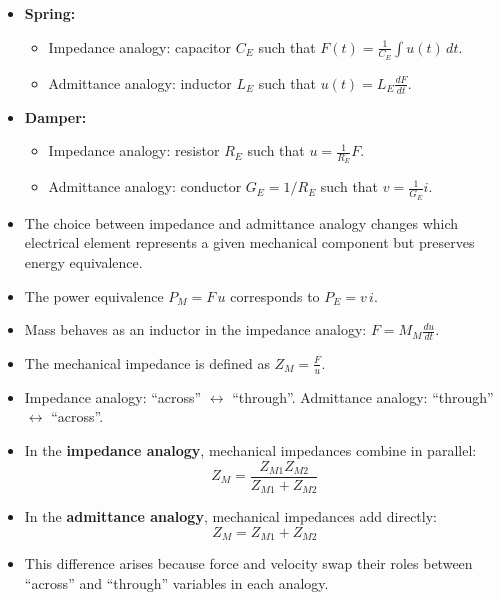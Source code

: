 \begin{tcolorbox}[colback=gray!10!white,colframe=black,title=\textbf{Summary – Mechanical Element Analogs}]
\begin{itemize}
    \item \textbf{Spring:}
    \begin{itemize}
        \item Impedance analogy: capacitor $C_E$ such that ${F}(t) = \frac{1}{C_E}\int {u}(t)\,dt$.
        \item Admittance analogy: inductor $L_E$ such that ${u}(t) = L_E \frac{d{F}}{dt}$.
    \end{itemize}
    \item \textbf{Damper:}
    \begin{itemize}
        \item Impedance analogy: resistor $R_E$ such that ${u} = \frac{1}{R_E}{F}$.
        \item Admittance analogy: conductor $G_E = 1/R_E$ such that $v = \frac{1}{G_E} i$.
    \end{itemize}
    \item The choice between impedance and admittance analogy changes which electrical element represents a given mechanical component but preserves energy equivalence.
\end{itemize}
\end{tcolorbox}


\begin{tcolorbox}[colback=gray!10!white,colframe=black,title=\textbf{Summary – Mechanical Impedance}]
\begin{itemize}
    \item The power equivalence $P_M = F \, u$ corresponds to $P_E = v \, i$.
    \item Mass behaves as an inductor in the impedance analogy: $F = M_M \frac{du}{dt}$.
    \item The mechanical impedance is defined as $Z_M = \frac{F}{u}$.
    \item Impedance analogy: “across” $\leftrightarrow$ “through”.  
          Admittance analogy: “through” $\leftrightarrow$ “across”.
\end{itemize}
\end{tcolorbox}

\begin{tcolorbox}[colback=gray!10!white,colframe=black,title=\textbf{Summary – Mechanical Impedance Combinations}]
\begin{itemize}
    \item In the \textbf{impedance analogy}, mechanical impedances combine in parallel:
    \[
    Z_M = \frac{Z_{M1} Z_{M2}}{Z_{M1} + Z_{M2}}
    \]
    \item In the \textbf{admittance analogy}, mechanical impedances add directly:
    \[
    Z_M = Z_{M1} + Z_{M2}
    \]
    \item This difference arises because force and velocity swap their roles between “across” and “through” variables in each analogy.
\end{itemize}
\end{tcolorbox}


